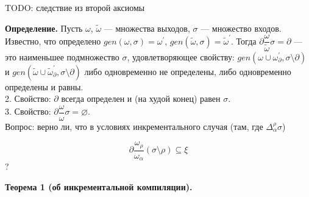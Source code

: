 





\hrulefill

TODO: следствие из второй аксиомы

\textbf{Определение.} Пусть $\omega$, $\tilde{\omega}$ --- множества выходов, $\sigma$ --- множество входов. Известно, что определено $gen(\omega, \sigma) = \omega^\prime$, $gen(\tilde{\omega}, \sigma) = \tilde{\omega}^\prime$. Тогда $\partial\dfrac{\omega}{\tilde{\omega}}\sigma = \partial$ --- это наименьшее подмножество $\sigma$, удовлетворяющее свойству: 
$gen(\omega \cup \omega^\prime_{\partial}, \sigma\setminus\partial)$ и
$gen(\tilde{\omega} \cup \tilde{\omega}^\prime_{\partial}, \sigma\setminus\partial)$ либо одновременно не определены, либо одновременно определены и равны. 
\\

2. Свойство: $\partial$ всегда определен и (на худой конец) равен $\sigma$.
\\

3. Свойство: $\partial\dfrac{\omega}{\omega}\sigma = \varnothing$.
\\

Вопрос: верно ли, что в условиях инкрементального случая (там, где $\Delta^\rho_\alpha\sigma$)

$$\partial\dfrac{\omega_\rho}{\omega_\alpha}(\sigma\setminus\rho)\subseteq\xi$$ ?

\begin{comment}
	\textbf{Доказательство:}

	\newcommand{\mypart}{\partial\dfrac{\omega_\rho}{\omega_\alpha}(\sigma\setminus\rho)}

	Докажем, что если $s \in \sigma\setminus\rho$, $s \notin \xi$, то $s \notin \mypart$. Обозначим $\tau = (\sigma\setminus\rho)\setminus\mypart$, тогда $\tau$ --- наибольшее подмножество $\sigma\setminus\rho$, такое, что $gen(\omega_\rho, \tau)$ определено $\Leftrightarrow$ $gen(\omega_\alpha, \tau)$ определено. Предположим, $s \in \mypart$, тогда $s \notin \tau$. Рассмотрим $gen(\omega_\rho, \tau)$.
\end{comment}

\newpage

\newcommand{\butpartial}{\sigma\setminus\rho\setminus\partial}

\textbf{Теорема 1 (об инкрементальной компиляции).}

